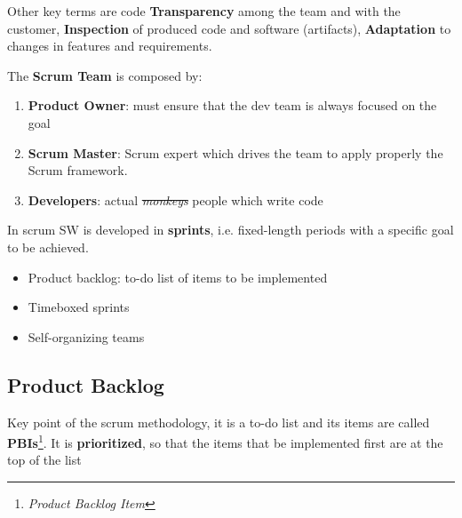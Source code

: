 Other key terms are code \textbf{Transparency} among the team and with the customer, \textbf{Inspection} of produced code and software (artifacts), \textbf{Adaptation} to changes in features and requirements.

The \textbf{Scrum Team} is composed by:
\begin{enumerate}
    \item \textbf{Product Owner}: must ensure that the dev team is always focused on the goal
    \item \textbf{Scrum Master}: Scrum expert which drives the team to apply properly the Scrum framework.
    \item \textbf{Developers}: actual \st{\textit{monkeys}} people which write code
\end{enumerate}

In scrum SW is developed in \textbf{sprints}, i.e. fixed-length periods with a specific goal to be achieved.

\begin{itemize}
    \item Product backlog: to-do list of items to be implemented
    \item Timeboxed sprints
    \item Self-organizing teams
\end{itemize}

\subsection{Product Backlog}
Key point of the scrum methodology,
it is a to-do list and its items are called \textbf{PBIs}\footnote{\textit{Product Backlog Item}}.
It is \textbf{prioritized},
so that the items that
be implemented first are at the top of the list



